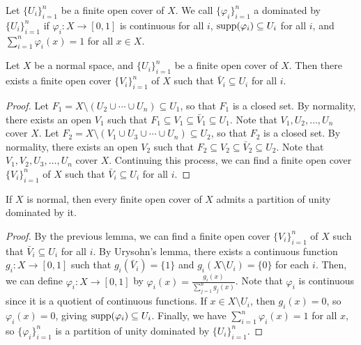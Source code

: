 \begin{definition}
    Let $\{U_{i}\}_{i=1}^{n}$ be a finite open cover of $X$. We call $\{\varphi_{i}\}_{i=1}^{n}$ a  dominated by $\{U_{i}\}_{i=1}^{n}$ if $\varphi_{i} : X \to [0,1]$ is continuous for all $i$, $\operatorname{supp}(\varphi_{i}) \subseteq U_{i}$ for all $i$, and $\sum_{i=1}^{n} \varphi_{i}(x) = 1$ for all $x \in X$.
\end{definition}

\begin{lemma}
    Let $X$ be a normal space, and $\{U_{i}\}_{i=1}^{n}$ be a finite open cover of $X$. Then there exists a finite open cover $\{V_{i}\}_{i=1}^{n}$ of $X$ such that $\bar{V}_{i} \subseteq U_{i}$ for all $i$.
\end{lemma}

\begin{proof}
    Let $F_{1} = X \setminus (U_{2} \cup \cdots \cup U_{n}) \subseteq U_{1}$, so that $F_{1}$ is a closed set. By normality, there exists an open $V_{1}$ such that $F_{1} \subseteq V_{1} \subseteq \bar{V}_{1} \subseteq U_{1}$. Note that $V_{1},U_{2},\ldots,U_{n}$ cover $X$. Let $F_{2} = X \setminus (V_{1} \cup U_{3} \cup \cdots \cup U_{n}) \subseteq U_{2}$, so that $F_{2}$ is a closed set. By normality, there exists an open $V_{2}$ such that $F_{2} \subseteq V_{2} \subseteq \bar{V}_{2} \subseteq U_{2}$. Note that $V_{1},V_{2},U_{3},\ldots,U_{n}$ cover $X$. Continuing this process, we can find a finite open cover $\{V_{i}\}_{i=1}^{n}$ of $X$ such that $\bar{V}_{i} \subseteq U_{i}$ for all $i$.
\end{proof}

\begin{theorem}
    If $X$ is normal, then every finite open cover of $X$ admits a partition of unity dominated by it.
\end{theorem}
\begin{proof}
    By the previous lemma, we can find a finite open cover $\{V_{i}\}_{i=1}^{n}$ of $X$ such that $\bar{V}_{i} \subseteq U_{i}$ for all $i$. By Urysohn's lemma, there exists a continuous function $g_{i} : X \to [0,1]$ such that $g_{i}(\bar{V}_{i}) = \{1\}$ and $g_{i}(X \setminus U_{i}) = \{0\}$ for each $i$. Then, we can define $\varphi_{i} : X \to [0,1]$ by $\varphi_{i}(x) = \frac{g_{i}(x)}{\sum_{j=1}^{n} g_{j}(x)}$. Note that $\varphi_{i}$ is continuous since it is a quotient of continuous functions. If $x \in X \setminus U_{i}$, then $g_{i}(x) = 0$, so $\varphi_{i}(x) = 0$, giving $\operatorname{supp}(\varphi_{i}) \subseteq U_{i}$. Finally, we have $\sum_{i=1}^{n} \varphi_{i}(x) = 1$ for all $x$, so $\{\varphi_{i}\}_{i=1}^{n}$ is a partition of unity dominated by $\{U_{i}\}_{i=1}^{n}$.
\end{proof}

